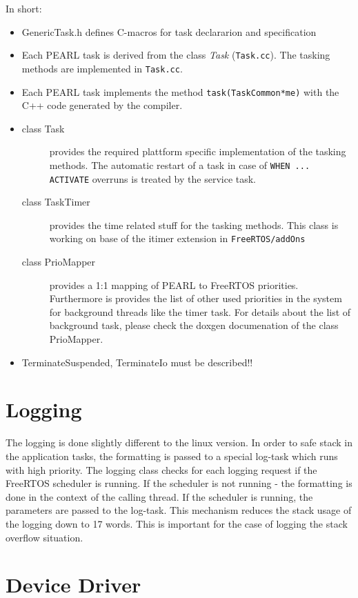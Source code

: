 In short:
\begin{itemize}
\item GenericTask.h defines C-macros for task declararion and specification
\item Each PEARL task is derived from the class {\em Task} (\verb|Task.cc|).
      The tasking methods are implemented in \verb|Task.cc|.
\item Each PEARL task implements the method \verb|task(TaskCommon*me)| 
    with the C++ code generated by the compiler.
\item {
  \begin{description}
  \item[class Task] provides the required plattform specific implementation
     of the tasking methods. The automatic restart of a task in case of
     \verb|WHEN ... ACTIVATE| overruns is treated by the service task.
  \item[class TaskTimer] provides the time related stuff for the tasking
     methods. This class is working on base of the itimer extension 
     in \texttt{FreeRTOS/addOns}
  \item[class PrioMapper] provides a 1:1 mapping of PEARL to FreeRTOS
      priorities. Furthermore is provides the list of other used
      priorities in the system for background threads like the timer task.
      For details about the list of background task, please 
      check the doxgen documenation of the class PrioMapper.
  \end{description}
}
\item TerminateSuspended, TerminateIo must be described!!
\end{itemize}


\section{Logging}
The logging is done slightly different to the linux version.
In order to safe stack in the application tasks, the formatting is passed
to a special log-task which runs with high priority.
The logging class checks for each logging request if the FreeRTOS scheduler
is running. If the scheduler is not running - the formatting is done in the 
context of the calling thread. If the scheduler is running, the parameters
are passed to the log-task.
This mechanism reduces the stack usage of the logging down to 17 words. This
is important for the case of logging the stack overflow situation.


\section{Device Driver}
\label{sec_microcontroller_devicedriver}

